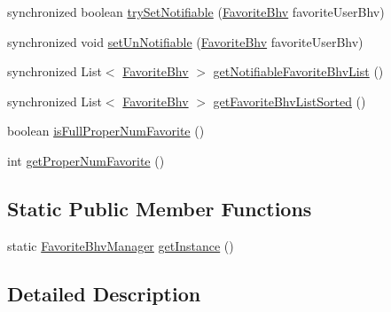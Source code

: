 \begin{DoxyCompactItemize}
\item 
synchronized boolean \hyperlink{classlab_1_1davidahn_1_1appshuttle_1_1view_1_1_favorite_bhv_manager_aa18a30831f7395a608cdedf787292ee6}{try\-Set\-Notifiable} (\hyperlink{classlab_1_1davidahn_1_1appshuttle_1_1view_1_1_favorite_bhv}{\-Favorite\-Bhv} favorite\-User\-Bhv)
\item 
synchronized void \hyperlink{classlab_1_1davidahn_1_1appshuttle_1_1view_1_1_favorite_bhv_manager_a35528d215a6d76f66a5825ede1890f10}{set\-Un\-Notifiable} (\hyperlink{classlab_1_1davidahn_1_1appshuttle_1_1view_1_1_favorite_bhv}{\-Favorite\-Bhv} favorite\-User\-Bhv)
\item 
synchronized \-List$<$ \hyperlink{classlab_1_1davidahn_1_1appshuttle_1_1view_1_1_favorite_bhv}{\-Favorite\-Bhv} $>$ \hyperlink{classlab_1_1davidahn_1_1appshuttle_1_1view_1_1_favorite_bhv_manager_a93308cece9a6a14f27a3866986730e8d}{get\-Notifiable\-Favorite\-Bhv\-List} ()
\item 
synchronized \-List$<$ \hyperlink{classlab_1_1davidahn_1_1appshuttle_1_1view_1_1_favorite_bhv}{\-Favorite\-Bhv} $>$ \hyperlink{classlab_1_1davidahn_1_1appshuttle_1_1view_1_1_favorite_bhv_manager_aba5d587e43f97309c98ccd9e4fe42ca4}{get\-Favorite\-Bhv\-List\-Sorted} ()
\item 
boolean \hyperlink{classlab_1_1davidahn_1_1appshuttle_1_1view_1_1_favorite_bhv_manager_a12715a118022ecb5bd146c5bebcde2fe}{is\-Full\-Proper\-Num\-Favorite} ()
\item 
int \hyperlink{classlab_1_1davidahn_1_1appshuttle_1_1view_1_1_favorite_bhv_manager_a915390c066b4d0c318750dee17457248}{get\-Proper\-Num\-Favorite} ()
\end{DoxyCompactItemize}
\subsection*{\-Static \-Public \-Member \-Functions}
\begin{DoxyCompactItemize}
\item 
static \hyperlink{classlab_1_1davidahn_1_1appshuttle_1_1view_1_1_favorite_bhv_manager}{\-Favorite\-Bhv\-Manager} \hyperlink{classlab_1_1davidahn_1_1appshuttle_1_1view_1_1_favorite_bhv_manager_ab92b1c857b0fdd635723335be0bde5e7}{get\-Instance} ()
\end{DoxyCompactItemize}


\subsection{\-Detailed \-Description}


